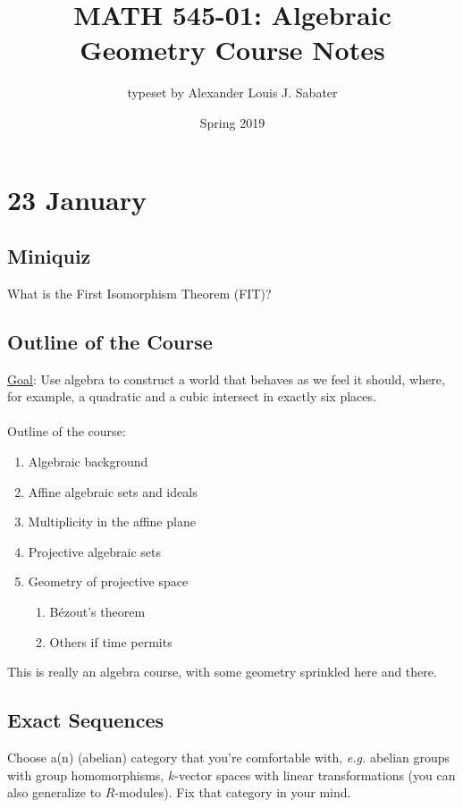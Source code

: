 \documentclass[12pt]{article}
\newcommand{\ita}[1]{\textit{#1}}
\theoremstyle{definition}
\begin{document}
\date{Spring 2019} 
\author{typeset by Alexander Louis J. Sabater}
\title{MATH 545-01: Algebraic Geometry Course Notes}
\maketitle
\tableofcontents
\newpage
\section{23 January}
\subsection{Miniquiz}
What is the First Isomorphism Theorem (FIT)?
\subsection{Outline of the Course}
\underline{Goal}: Use algebra to construct a world that behaves as we feel it should, where, for example, a quadratic and a cubic intersect in exactly six places.\\\\
Outline of the course:
\begin{enumerate}
    \item Algebraic background
    \item Affine algebraic sets and ideals
    \item Multiplicity in the affine plane
    \item Projective algebraic sets
    \item Geometry of projective space
    \begin{enumerate}
        \item B\'ezout's theorem
        \item Others if time permits
    \end{enumerate}
\end{enumerate}
This is really an algebra course, with some geometry sprinkled here and there.
\subsection{Exact Sequences}
Choose a(n) (abelian) category that you're comfortable with, \ita{e.g.} abelian groups with group homomorphisms, $k$-vector spaces with linear transformations (you can also generalize to $R$-modules). Fix that category in your mind.
\end{document}
